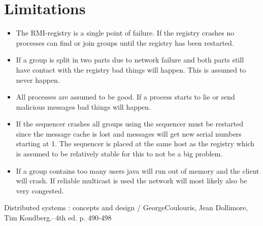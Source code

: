 \documentclass[english]{article}
\begin{document}
\section{Limitations}
\begin{itemize}
\item The RMI-registry is a single point of failure. If the registry crashes no processes can find or join groups until the registry has been restarted.

\item If a group is split in two parts due to network failure and both parts still have contact with the registry bad things will happen. This is assumed to never happen.

\item All processes are assumed to be good. If a process starts to lie or send malicious messages bad things will happen.

\item If the sequencer crashes all groups using the sequencer must be restarted since the message cache is lost and messages will get new serial numbers starting at 1. The sequencer is placed at the same host as the registry which is assumed to be relatively stable for this to not be a big problem.

\item If a group contains too many users java will run out of memory and the client will crash. If reliable multicast is used the network will most likely also be very congested.


\end{itemize}


\begin{thebibliography}{5}

 Distributed systems : concepts and design / GeorgeCoulouris, Jean Dollimore, Tim Kondberg.--4th ed. p. 490-498

\end{thebibliography}


\appendix
\end{document}
